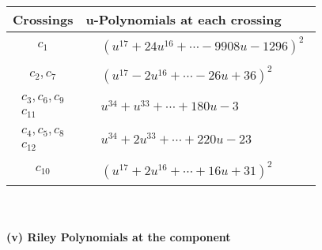 \documentclass[1p]{elsarticle_modified}
\theoremstyle{definition}
\begin{document}
\begin{tabular}{m{50pt}|m{274pt}}
Crossings & \hspace{64pt}u-Polynomials at each crossing \\
\hline $$\begin{aligned}c_{1}\end{aligned}$$&$\begin{aligned}
&(u^{17}+24 u^{16}+\cdots-9908 u-1296)^{2}
\end{aligned}$\\
\hline $$\begin{aligned}c_{2},c_{7}\end{aligned}$$&$\begin{aligned}
&(u^{17}-2 u^{16}+\cdots-26 u+36)^{2}
\end{aligned}$\\
\hline $$\begin{aligned}c_{3},c_{6},c_{9}\\c_{11}\end{aligned}$$&$\begin{aligned}
&u^{34}+u^{33}+\cdots+180 u-3
\end{aligned}$\\
\hline $$\begin{aligned}c_{4},c_{5},c_{8}\\c_{12}\end{aligned}$$&$\begin{aligned}
&u^{34}+2 u^{33}+\cdots+220 u-23
\end{aligned}$\\
\hline $$\begin{aligned}c_{10}\end{aligned}$$&$\begin{aligned}
&(u^{17}+2 u^{16}+\cdots+16 u+31)^{2}
\end{aligned}$\\
\hline
\end{tabular}\\~\\
\newpage\renewcommand{\arraystretch}{1}
\flushleft \textbf{(v) Riley Polynomials at the component}\newline \\
\end{document}
